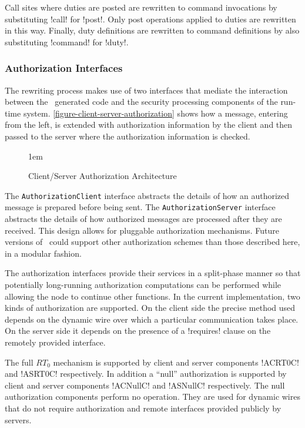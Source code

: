 
Call sites where duties are posted are rewritten to command invocations by substituting !call!
for !post!. Only post operations applied to duties are rewritten in this way. Finally, duty
definitions are rewritten to command definitions by also substituting !command! for !duty!.

\subsubsection{Authorization Interfaces}

The rewriting process makes use of two interfaces that mediate the interaction between the
\Sprocket\ generated code and the security processing components of the run-time system.
\autoref{figure-client-server-authorization} shows how a message, entering from the left, is
extended with authorization information by the client and then passed to the server where the
authorization information is checked.

\begin{figure}[htbp]
  
  \centerline{\raise 1em\box\graph}
  \caption{Client/Server Authorization Architecture}
  \label{figure-client-server-authorization}
\end{figure}

The \texttt{AuthorizationClient} interface abstracts the details of how an authorized message is
prepared before being sent. The \texttt{AuthorizationServer} interface abstracts the details of
how authorized messages are processed after they are received. This design allows for pluggable
authorization mechanisms. Future versions of \Sprocket\ could support other authorization
schemes than those described here, in a modular fashion.

The authorization interfaces provide their services in a split-phase manner so that potentially
long-running authorization computations can be performed while allowing the node to continue
other functions. In the current implementation, two kinds of authorization are supported. On the
client side the precise method used depends on the dynamic wire over which a particular
communication takes place. On the server side it depends on the presence of a !requires! clause
on the remotely provided interface.

The full $RT_0$ mechanism is supported by client and server components !ACRT0C! and !ASRT0C!
respectively. In addition a ``null'' authorization is supported by client and server components
!ACNullC! and !ASNullC! respectively. The null authorization components perform no operation.
They are used for dynamic wires that do not require authorization and remote interfaces provided
publicly by servers.

